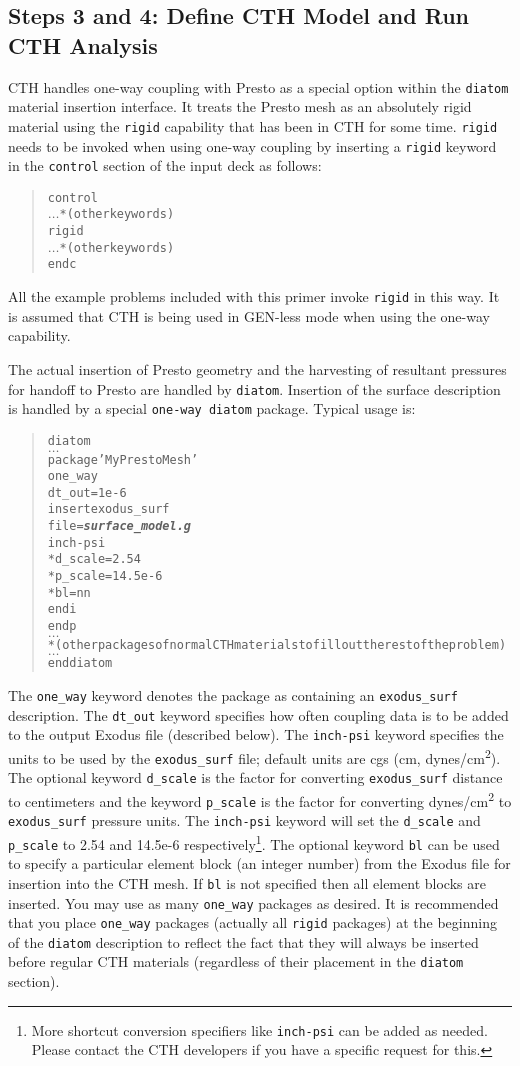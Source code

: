 \documentclass[11pt,twoside]{article}
\newcommand{\cmd}[1]
   {\mbox{\tt #1}\null}
\newcommand{\file}[1]
   {\mbox{\bf\em #1}\null}
\newenvironment{source}
{\small\begin{quote}\begin{alltt}}
{\end{alltt}\end{quote}\normalsize}
\begin{document}
\subsection{Steps 3 and 4: Define CTH Model and Run CTH Analysis}
CTH handles one{}-way coupling with Presto as a special
option within the \cmd{diatom} material insertion interface.  It treats the
Presto mesh as an absolutely rigid material using the \cmd{rigid} capability
that has been in CTH for some time.  \cmd{rigid} needs to be invoked when
using one{}-way coupling by inserting a \cmd{rigid} keyword in the \cmd{control}
section of the input deck as follows:
\begin{source}
control
${\ldots}$*(other keywords)
rigid
${\ldots}$*(other keywords)
endc
\end{source}

All the example problems included with this primer invoke \cmd{rigid}
in this way.  It is assumed that CTH is being used in GEN{}-less mode
when using the one-way capability.

The actual insertion of Presto geometry and the harvesting of
resultant pressures for handoff to Presto are handled by \cmd{diatom}.
Insertion of the surface description is handled by a special \cmd{one{}-way
diatom} package. Typical usage is:
\begin{source}
diatom
${\ldots}$
  package 'My Presto Mesh'
    one_way
    dt_out = 1e-6
    insert exodus_surf
      file = \file{surface\_model.g}
      inch-psi
      *d_scale=2.54
      *p_scale=14.5e-6
      *bl = nn
    endi
  endp
${\ldots}$
* (other packages of normal CTH materials to fill out the rest of the problem)
${\ldots}$
enddiatom
\end{source}
The \cmd{one\_way} keyword denotes the package as containing an
\cmd{exodus\_surf} description. The \cmd{dt\_out} keyword specifies how often
coupling data is to be added to the output Exodus file (described
below). The \cmd{inch{}-psi} keyword specifies the units to be used
by the \cmd{exodus\_surf} file; default units are cgs (cm,
dynes/cm\textsuperscript{2}). The optional keyword \cmd{d\_scale} is
the factor for converting \cmd{exodus\_surf} distance to
centimeters and the keyword \cmd{p\_scale} is the factor for
converting dynes/cm\textsuperscript{2} to \cmd{exodus\_surf}
pressure units. The \cmd{inch{}-psi} keyword will set the
\cmd{d\_scale} and \cmd{p\_scale} to 2.54 and 14.5e{}-6
respectively\footnote{More shortcut conversion specifiers like
\cmd{inch{}-psi} can be added as needed. Please contact the CTH developers if you have a specific request for
this.}. The optional keyword \cmd{bl} can be used to specify a
particular element block (an integer number) from the Exodus file for
insertion into the CTH mesh. If \cmd{bl} is not specified then all
element blocks are inserted.  You may use as many \cmd{one\_way} packages
as desired.  It is recommended that you place \cmd{one\_way} packages
(actually all \cmd{rigid} packages) at the beginning of the \cmd{diatom}
description to reflect the fact that they will always be inserted
before regular CTH materials (regardless of their placement in the
\cmd{diatom} section).
\end{document}

